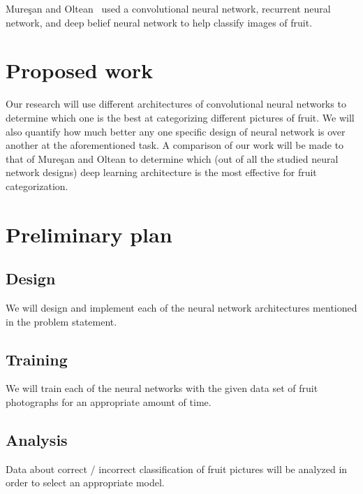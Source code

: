 \documentclass[10pt,letterpaper]{article}
\begin{document}
Mure\c{s}an and Oltean~\cite{A5} used a convolutional neural network, recurrent neural network, and deep belief neural network to help classify images of fruit.

\section{Proposed work}

Our research will use different architectures of convolutional neural networks to determine which one is the best at categorizing different pictures of fruit. We will also quantify how much better any one specific design of neural network is over another at the aforementioned task. A comparison of our work will be made to that of Mure\c{s}an and Oltean to determine which (out of all the studied neural network designs) deep learning architecture is the most effective for fruit categorization. 

\section{Preliminary plan}

\subsection{Design}

We will design and implement each of the neural network architectures mentioned in the problem statement.

\subsection{Training}

We will train each of the neural networks with the given data set of fruit photographs for an appropriate amount of time.

\subsection{Analysis}

Data about correct / incorrect classification of fruit pictures will be analyzed in order to select an appropriate model.

{\small


}
\end{document}
